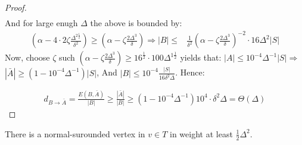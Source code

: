 \begin{proof}
\begin{equation*}
\begin{split}
     \end{split}
   \end{equation*}
   And for large enugh $\Delta$ the above is bounded by:
   \begin{equation*}
     \begin{split}
     \left(  \alpha -  4\cdot 2\zeta \frac{\Delta^{2\frac{1}{2}}}{\delta^{2}}   \right) \ge \left( \alpha -  \zeta \frac{2\Delta^{3}}{\delta}  \right) \Rightarrow |B|  \le  & \frac{1}{\delta^{2}} \left( \alpha -  \zeta \frac{2\Delta^{3}}{\delta}  \right)^{-2} \cdot 16\Delta^{2}|S| 
     \end{split}
   \end{equation*}
   Now, choose $\zeta$ such $\left( \alpha -  \zeta \frac{2\Delta^{3}}{\delta}  \right) \ge 16^{\frac{1}{2}} \cdot 100 \Delta^{1\frac{1}{2}}$ yields that: $|A| \le 10^{-4}\Delta^{-1} |S| \Rightarrow $$ |\bar{A}| \ge \left( 1 - 10^{-4} \Delta^{-1}\right)|S|$, And $|B| \le 10^{-4} \frac{|S|}{16 \delta^{2}\Delta}$. Hence:

   \begin{equation*}
     \begin{split}
       d_{B\rightarrow \bar{A}} = \frac{ E\left(B,\bar{A}\right) }{|B|} \ge \frac{|\bar{A}|}{|B|} \ge \left( 1 - 10^{-4}\Delta^{-1}  \right) 10^{4} \cdot \delta^{2}\Delta  = \Theta\left( \Delta \right)
     \end{split}
   \end{equation*}
 \end{proof}
\begin{claim}
   There is a normal-surounded vertex in $v \in T$ in weight at least $\frac{1}{2} \Delta^{2}$.   
 \end{claim}
